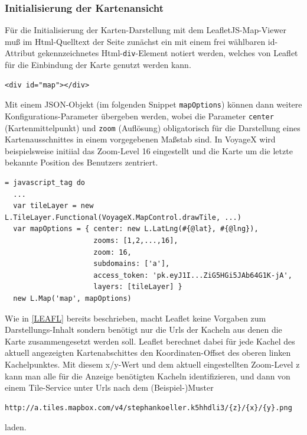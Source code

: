 \subsubsection{Initialisierung der Kartenansicht}\label{5_DARS_KART}
Für die Initialisierung der Karten-Darstellung mit dem LeafletJS-Map-Viewer muß im Html-Quelltext der Seite zunächst ein mit einem frei wählbaren id-Attribut gekennzeichnetes Html-\texttt{div}-Element notiert werden, welches von Leaflet für die Einbindung der Karte genutzt werden kann.
\lstset{language=Html5}
\begin{lstlisting}[frame=single,numbers=none,xleftmargin=0pt]
<div id="map"></div>
\end{lstlisting}
Mit einem JSON-Objekt (im folgenden Snippet \texttt{mapOptions}) können dann weitere Konfigurations-Parameter übergeben werden, wobei die Parameter \texttt{center} (Kartenmittelpunkt) und \texttt{zoom} (Auflösung) obligatorisch für die Darstellung eines Kartenausschnittes in einem vorgegebenen Maßstab sind. In VoyageX wird beispielsweise
initiial das Zoom-Level 16 eingestellt und die Karte um die letzte bekannte Position des Benutzers zentriert.
\lstset{language=JavaScript}
\begin{lstlisting}[frame=single,xleftmargin=0pt,caption={Initialisierung der Karte in einer Haml-Datei},captionpos=b,label={lst:CL_MapInit}]
= javascript_tag do
  ...
  var tileLayer = new L.TileLayer.Functional(VoyageX.MapControl.drawTile, ...)
  var mapOptions = { center: new L.LatLng(#{@lat}, #{@lng}),
   				   	 zooms: [1,2,...,16],
   				   	 zoom: 16,
   				   	 subdomains: ['a'],
   				   	 access_token: 'pk.eyJ1I...ZiG5HGi5JAb64G1K-jA',
   				   	 layers: [tileLayer] }
  new L.Map('map', mapOptions)
\end{lstlisting} \vspace{0.8cm}

\noindent Wie in \ref{LEAFL} bereits beschrieben, macht Leaflet keine Vorgaben zum Darstellungs-Inhalt sondern benötigt nur die Urls der Kacheln aus denen die Karte zusammengesetzt werden soll. Leaflet berechnet dabei für jede Kachel des aktuell angezeigten Kartenabschittes den Koordinaten-Offset des oberen linken Kachelpunktes. Mit diesem x/y-Wert und dem aktuell eingestellten Zoom-Level z kann man alle für die Anzeige benötigten Kacheln identifizieren, und dann von einem Tile-Service unter Urls nach dem (Beispiel-)Muster 
\lstset{language=JavaScript}
\begin{lstlisting}[frame=single,numbers=none,xleftmargin=0pt,caption={Kachel-Bild-Url-Template},captionpos=b,label={lst:CL_TSPUTempl}]
http://a.tiles.mapbox.com/v4/stephankoeller.k5hhdli3/{z}/{x}/{y}.png
\end{lstlisting}%
laden.

